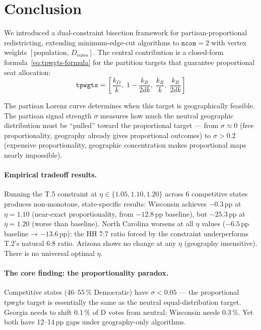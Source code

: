 \section{Conclusion}
\label{sec:conclusion}

We introduced a dual-constraint bisection framework for partisan-proportional
redistricting, extending minimum-edge-cut algorithms to $\mathtt{ncon}=2$ with
vertex weights $[\text{population},\, D_{\text{votes}}]$.
The central contribution is a closed-form formula~\eqref{eq:tpwgts-formula}
for the partition targets that guarantee proportional seat allocation:
\[
  \mathtt{tpwgts} = \left[\frac{k_D}{k},\; 1 - \frac{k_R}{2dk},\;
                          \frac{k_R}{k},\; \frac{k_R}{2dk}\right]
\]

The partisan Lorenz curve determines when this target is geographically feasible.
The partisan signal strength $\sigma$ measures how much the neutral geographic
distribution must be ``pulled'' toward the proportional target --- from
$\sigma \approx 0$ (free proportionality, geography already gives proportional
outcomes) to $\sigma > 0.2$ (expensive proportionality, geographic concentration
makes proportional maps nearly impossible).

\paragraph{Empirical tradeoff results.}
Running the T.5 constraint at $\eta \in \{1.05, 1.10, 1.20\}$ across 6 competitive
states produces non-monotone, state-specific results:
Wisconsin achieves $-0.3$\,pp at $\eta = 1.10$ (near-exact proportionality, from
$-12.8$\,pp baseline), but $-25.3$\,pp at $\eta = 1.20$ (worse than baseline).
North Carolina worsens at all $\eta$ values ($-6.5$\,pp baseline → $-13.6$\,pp):
the HH 7:7 ratio forced by the constraint underperforms T.2's natural 6:8 ratio.
Arizona shows no change at any $\eta$ (geography insensitive).
There is no universal optimal $\eta$.

\paragraph{The core finding: the proportionality paradox.}
Competitive states (46--55\,\% Democratic) have $\sigma < 0.05$ --- the
proportional tpwgts target is essentially the same as the neutral equal-distribution
target. Georgia needs to shift 0.1\,\% of D votes from neutral; Wisconsin needs
0.3\,\%. Yet both have 12--14\,pp gaps under geography-only algorithms.

